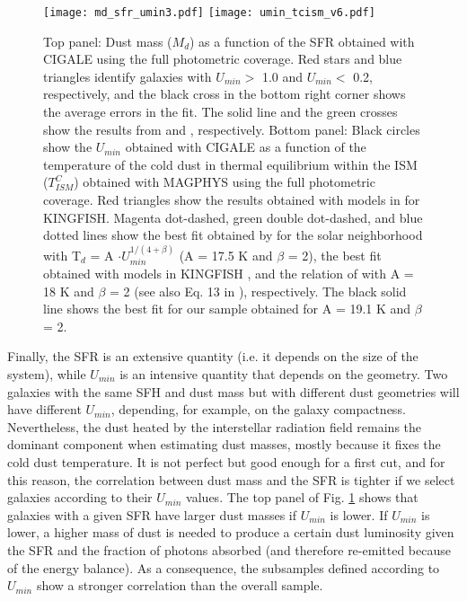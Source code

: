 \documentclass{aa}
\begin{document}
\begin{figure}\begin{center}
\texttt{[image: md\_sfr\_umin3.pdf]}
\texttt{[image: umin\_tcism\_v6.pdf]}
\end{center} 
\caption{Top panel: Dust mass ($M_d$) as a function of the SFR obtained with CIGALE \citep{nol} using the full photometric coverage. Red stars and blue triangles identify galaxies with $U_{min} >$ 1.0 and $U_{min} <$ 0.2, respectively, and the black cross in the bottom right corner shows the average errors in the fit. The solid line and the green crosses show the results from \cite{dac2} and \cite{smi}, respectively. Bottom panel: Black circles show the $U_{min}$ obtained with CIGALE as a function of the temperature of the cold dust in thermal equilibrium within the ISM ($T^C_{ISM}$) obtained with MAGPHYS using the full photometric coverage. Red triangles show the results obtained with \cite{dra} models in \cite{hun} for KINGFISH. Magenta dot-dashed, green double dot-dashed, and blue dotted lines show the best fit obtained by \cite{boul} for the solar neighborhood with T$_d$ = A $\cdot U_{min}^{1/(4+\beta)}$ (A = 17.5 K and $\beta$ = 2), the best fit obtained with \cite{dra} models in KINGFISH \citep{hun}, and the relation of \cite{dra} with A = 18 K and $\beta$ = 2 (see also Eq. 13 in \citealt{dra3}), respectively. The black solid line shows the best fit for our sample obtained for A = 19.1 K and $\beta$ = 2.}\label{md_sfr}\end{figure}

Finally, the SFR is an extensive quantity (i.e. it depends on the size of the system), while $U_{min}$ is an intensive quantity that depends on the geometry. Two galaxies with the same SFH and dust mass but with different dust geometries will have different $U_{min}$,  depending, for example, on the galaxy compactness. Nevertheless, the dust heated by the interstellar radiation field remains the dominant component when estimating dust masses, mostly because it fixes the cold dust temperature. It is not perfect but good enough for a first cut, and for this reason, the correlation between dust mass and the SFR is tighter if we select galaxies according to their $U_{min}$ values. The top panel of Fig. \ref{md_sfr} shows that galaxies with a given SFR have larger dust masses if $U_{min}$ is lower. If $U_{min}$ is lower, a higher mass of dust is needed to produce a certain dust luminosity given the SFR and the fraction of photons absorbed (and therefore re-emitted because of the energy balance). As a consequence, the subsamples defined according to $U_{min}$ show a stronger correlation than the overall sample.
\end{document}
